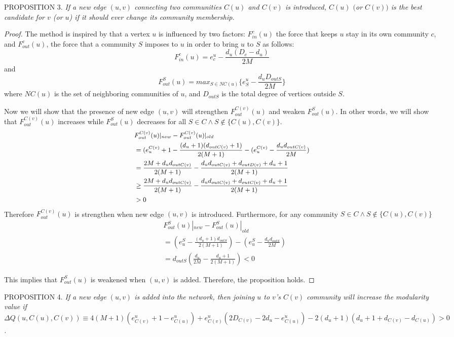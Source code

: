 PROPOSITION 3.
{\em If a new edge $(u,v)$ connecting two communities $C(u)$ and $C(v)$ is introduced, $C(u)$ $($or $C(v))$ is the best candidate for $v$ (or $u$) if it should ever change its community membership.}

\begin{proof}
The method is inspired by \cite{PhysRevE.78.046115} that a vertex $u$ is influenced by two factors: $F^c_{in}(u)$ the force that keeps $u$ stay in its own community $c$, and $F^c_{out}(u)$, the force that a community $S$ imposes to $u$ in order to bring $u$ to $S$ as follows:
\[
F^c_{in}(u)=e_c^u-\frac{d_u(D_c-d_u)}{2M}
\]
and 
\[
F^S_{out}(u)=max_{S\in NC(u)} \{e_S^u - \frac{d_u D_{outS}}{2M}\}
\]
where $NC(u)$ is the set of neighboring communities of $u$, and $D_{outS}$ is the total degree of vertices outside $S$.

Now we will show that the presence of new edge $(u,v)$ will strengthen $F^{C(v)}_{out}(u)$ and weaken $F^S_{out}(u)$. In other words, we will show that $F^{C(v)}_{out}(u)$ increases while $F^S_{out}(u)$ decreases for all $S \in C \wedge S \notin \{C(u),C(v)\}$.
\[\small
\begin{split}
&F^{C(v)}_{out}(u)|_{new} - F^{C(v)}_{out}(u)|_{old}\\
&=(e_u^{C(v)}+1-\frac{(d_u+1)(d_{outC(v)}+1)}{2(M+1)} - (e_u^{C(v)} - \frac{d_ud_{outC(v)}}{2M})\\
&= \frac{2M+d_ud_{outC(v)}}{2(M+1)} - \frac{d_ud_{outC(v)}+d_{outD(v)}+d_u+1}{2(M+1)}\\
&\geq \frac{2M+d_ud_{outC(v)}}{2(M+1)} - \frac{d_u d_{outC(v)}+d_{outC(v)}+d_u+1}{2(M+1)}\\
&>0
\end{split}
\]
Therefore $F^{C(v)}_{out}(u)$ is strengthen when new edge $(u,v)$ is introduced. Furthermore, for any community $S\in C \wedge S\notin \{C(u),C(v)\}$
\[
\begin{split}
& F^{S}_{out}(u)|_{new} - F^{S}_{out}(u)|_{old}\\
&= (e^S_u-\frac{(d_u+1)d_{outS}}{2(M+1)}) - (e^S_u - \frac{d_ud_{outS}}{2M})\\
&= d_{outS}(\frac{d_u}{2M} - \frac{d_u+1}{2(M+1)})<0
\end{split}
\]

This implies that $F^S_{out}(u)$ is weakened when $(u,v)$ is added. Therefore,  the proposition holds.
\end{proof}


PROPOSITION 4.
{\em If a new edge $(u,v)$ is added into the network, then joining $u$ to $v$'s $C(v)$ community will increase the modularity value  if $\Delta Q(u,C(u),C(v)) \equiv 4(M+1)(e_{C(v)}^u+1-e_{C(u)}^u)+e_{C(v)}^u(2D_{C(v)}-2d_u-e_{C(u)}^u) - 2(d_u+1)(d_u+1+d_{C(v)}-d_{C(u)})>0$.}

